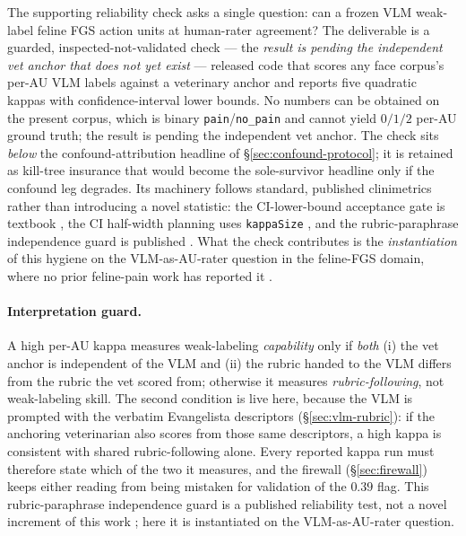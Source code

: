 The supporting reliability check asks a single question: can a frozen VLM
weak-label feline FGS action units at human-rater agreement? The deliverable is
a guarded, inspected-not-validated check --- the \emph{result is pending the
independent vet anchor that does not yet exist} --- released code that scores any
face corpus's per-AU VLM labels against a veterinary anchor and reports five
quadratic kappas with confidence-interval lower bounds. No numbers can be
obtained on the present corpus, which is binary \texttt{pain}/\texttt{no\_pain}
and cannot yield $0/1/2$ per-AU ground truth; the result is pending the
independent vet anchor. The check sits \emph{below} the confound-attribution
headline of \S\ref{sec:confound-protocol}; it is retained as kill-tree insurance
that would become the sole-survivor headline only if the confound leg degrades.
Its machinery follows standard, published clinimetrics rather than introducing a
novel statistic: the CI-lower-bound acceptance gate is textbook
\cite{tractenberg2010kappa,donner2010kappa,rotondi2012kappa,rotondi2018kappasize,simwright2005kappa},
the CI half-width planning uses \texttt{kappaSize}
\cite{rotondi2018kappasize}, and the rubric-paraphrase independence guard is
published \cite{weng2026policy}. What the check contributes is the
\emph{instantiation} of this hygiene on the VLM-as-AU-rater question in the
feline-FGS domain, where no prior feline-pain work has reported it
\cite{evangelista2021fgs,cheng2020fgs}.

\paragraph{Interpretation guard.} A high per-AU kappa measures weak-labeling
\emph{capability} only if \emph{both} (i) the vet anchor is independent of the
VLM and (ii) the rubric handed to the VLM differs from the rubric the vet scored
from; otherwise it measures \emph{rubric-following}, not weak-labeling skill.
The second condition is live here, because the VLM is prompted with the verbatim
Evangelista descriptors (\S\ref{sec:vlm-rubric}): if the anchoring veterinarian
also scores from those same descriptors, a high kappa is consistent with shared
rubric-following alone. Every reported kappa run must therefore state which of
the two it measures, and the firewall (\S\ref{sec:firewall}) keeps either
reading from being mistaken for validation of the $0.39$ flag. This
rubric-paraphrase independence guard is a published reliability test, not a novel
increment of this work \cite{weng2026policy}; here it is instantiated on the
VLM-as-AU-rater question.

